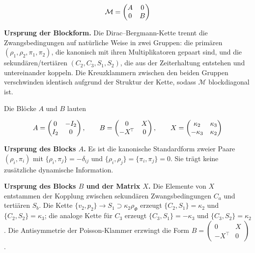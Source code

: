 ﻿\documentclass[11pt,letterpaper]{article}
\begin{document}
\begin{equation*}
  \resizebox{\ifdim\width>\linewidth \linewidth\else\width\fi}{!}{$\displaystyle \mathcal{M} = \begin{pmatrix} A & 0 \\ 0 & B \end{pmatrix}$}
\end{equation*}

\textbf{Ursprung der Blockform.} Die Dirac--Bergmann-Kette trennt die Zwangsbedingungen auf natürliche Weise in zwei Gruppen: die primären $(\rho_1, \rho_2, \pi_1, \pi_2)$, die kanonisch mit ihren Multiplikatoren gepaart sind, und die sekundären/tertiären $(C_2, C_3, S_1, S_2)$, die aus der Zeiterhaltung entstehen und untereinander koppeln. Die Kreuzklammern zwischen den beiden Gruppen verschwinden identisch aufgrund der Struktur der Kette, sodass $\mathcal{M}$ blockdiagonal ist.

Die Blöcke $A$ und $B$ lauten

\begin{equation*}
  \resizebox{\ifdim\width>\linewidth \linewidth\else\width\fi}{!}{$\displaystyle A = \begin{pmatrix} 0 & -I_2 \\ I_2 & 0 \end{pmatrix}, \qquad B = \begin{pmatrix} 0 & X \\ -X^{\!\top} & 0 \end{pmatrix}, \qquad X = \begin{pmatrix} \kappa_2 & \kappa_3 \\ -\kappa_3 & \kappa_2 \end{pmatrix}$}
\end{equation*}

\textbf{Ursprung des Blocks $A$.} Es ist die kanonische Standardform zweier Paare $(\rho_i, \pi_i)$ mit $\{\rho_i, \pi_j\} = -\delta_{ij}$ und $\{\rho_i, \rho_j\} = \{\pi_i, \pi_j\} = 0$. Sie trägt keine zusätzliche dynamische Information.

\textbf{Ursprung des Blocks $B$ und der Matrix $X$.} Die Elemente von $X$ entstammen der Kopplung zwischen sekundären Zwangsbedingungen $C_a$ und tertiären $S_b$. Die Kette $\{v_2, p_2\} \to S_1 \supset \kappa_2 \rho_\Phi$ erzeugt $\{C_2, S_1\} = \kappa_2$ und $\{C_2, S_2\} = \kappa_3$; die analoge Kette für $C_3$ erzeugt $\{C_3, S_1\} = -\kappa_3$ und $\{C_3, S_2\} = \kappa_2$. Die Antisymmetrie der Poisson-Klammer erzwingt die Form $B = \begin{pmatrix} 0 & X \\ -X^{\!\top} & 0 \end{pmatrix}$.
\end{document}
